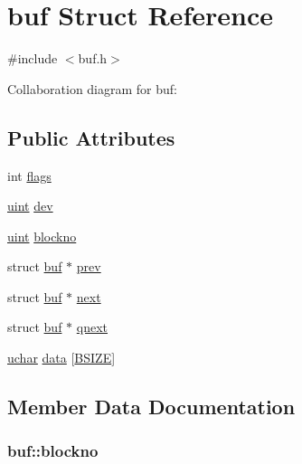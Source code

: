\hypertarget{structbuf}{}\section{buf Struct Reference}
\label{structbuf}


{\ttfamily \#include $<$buf.\+h$>$}



Collaboration diagram for buf\+:
\subsection*{Public Attributes}
\begin{DoxyCompactItemize}
\item 
int \hyperlink{structbuf_ae7d6b6c34fdeadb38970efd0554aa1a9}{flags}
\item 
\hyperlink{custom__types_8h_a91ad9478d81a7aaf2593e8d9c3d06a14}{uint} \hyperlink{structbuf_ac96082c2b5f22133ac7092ef81487227}{dev}
\item 
\hyperlink{custom__types_8h_a91ad9478d81a7aaf2593e8d9c3d06a14}{uint} \hyperlink{structbuf_a756b2bcc88008bef7f21d688aa4a7a48}{blockno}
\item 
struct \hyperlink{structbuf}{buf} $\ast$ \hyperlink{structbuf_a930cab1e1b3751795d31bfd0291dff4a}{prev}
\item 
struct \hyperlink{structbuf}{buf} $\ast$ \hyperlink{structbuf_ab18c18abb22f07617619e9a74c71f51a}{next}
\item 
struct \hyperlink{structbuf}{buf} $\ast$ \hyperlink{structbuf_aba5c088c4da07a5ec88edfacdae9b85a}{qnext}
\item 
\hyperlink{custom__types_8h_a65f85814a8290f9797005d3b28e7e5fc}{uchar} \hyperlink{structbuf_ab0ec38784ab94ed35e575cf6d33912d2}{data} \mbox{[}\hyperlink{fs_8h_a403cf3149c084cea115b85c90721039a}{B\+S\+I\+ZE}\mbox{]}
\end{DoxyCompactItemize}


\subsection{Member Data Documentation}
\subsubsection[{\texorpdfstring{blockno}{blockno}}]{ buf\+::blockno}\hypertarget{structbuf_a756b2bcc88008bef7f21d688aa4a7a48}{}\label{structbuf_a756b2bcc88008bef7f21d688aa4a7a48}
